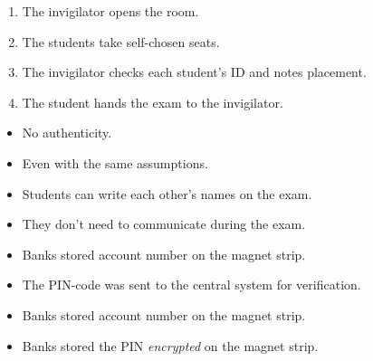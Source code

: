 \begin{frame}
  \begin{example}
    \begin{enumerate}
      \item The invigilator opens the room.
      \item The students take self-chosen seats.
      \item The invigilator checks each student's ID and notes placement.
      \item The student hands the exam to the invigilator.
    \end{enumerate}
  \end{example}

  \pause

  \begin{remark}
    \begin{itemize}
      \item No authenticity.
      \item Even with the same assumptions.
      \item Students can write each other's names on the exam.
      \item They don't need to communicate during the exam.
    \end{itemize}
  \end{remark}
\end{frame}

\begin{frame}
  \begin{example}
    \begin{itemize}
      \item Banks stored account number on the magnet strip.
      \item The PIN-code was sent to the central system for verification.
    \end{itemize}
  \end{example}

  \pause

  \begin{example}
    \begin{itemize}
      \item Banks stored account number on the magnet strip.
      \item Banks stored the PIN \emph{encrypted} on the magnet strip.
    \end{itemize}
  \end{example}
\end{frame}

